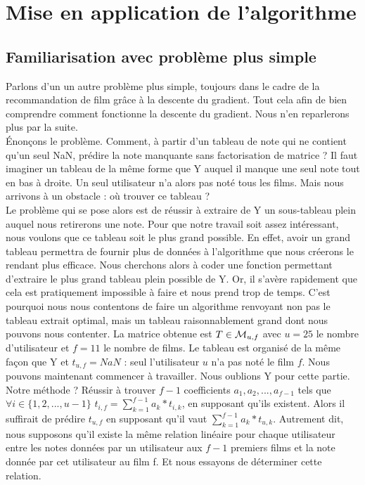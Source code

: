 \documentclass[a4paper,10pt]{article}
\begin{document}
\section{Mise en application de l'algorithme}
\subsection{Familiarisation avec problème plus simple}

Parlons d'un un autre problème plus simple, toujours dans le cadre de la recommandation de film grâce à la descente du gradient. Tout cela afin de bien comprendre comment fonctionne la descente du gradient. Nous n'en reparlerons plus par la suite.\\

Énonçons le problème. Comment, à partir d'un tableau de note qui ne contient qu'un seul NaN, prédire la note manquante sans factorisation de matrice ? Il faut imaginer un tableau de la même forme que Y auquel il manque une seul note tout en bas à droite. Un seul utilisateur n'a alors pas noté tous les films. Mais nous arrivons à un obstacle : où trouver ce tableau ?\\

Le problème qui se pose alors est de réussir à extraire de Y un sous-tableau plein auquel nous retirerons une note. Pour que notre travail soit assez intéressant, nous voulons que ce tableau soit le plus grand possible. En effet, avoir un grand tableau permettra de fournir plus de données à l'algorithme que nous créerons le rendant plus efficace. Nous cherchons alors à coder une fonction permettant d'extraire le plus grand tableau plein possible de Y. Or, il s'avère rapidement que cela est pratiquement impossible à faire et nous prend trop de temps. C'est pourquoi nous nous contentons de faire un algorithme renvoyant non pas le tableau extrait optimal, mais un tableau raisonnablement grand dont nous pouvons nous contenter. La matrice obtenue est $T \in {\cal M}_{u, f}$ avec $u = 25$ le nombre d'utilisateur et $f = 11$ le nombre de films. Le tableau est organisé de la même façon que Y et $t_{u, f} = NaN$ : seul l'utilisateur $u$ n'a pas noté le film $f$. Nous pouvons maintenant commencer à travailler. Nous oublions Y pour cette partie.\\

Notre méthode ? Réussir à trouver $f-1$ coefficients $a_1, a_2, ..., a_{f-1}$ tels que $\forall i \in \{1, 2, ..., u-1\}$ $t_{i, f} = \sum_{k = 1}^{f-1} a_k * t_{i, k}$, en supposant qu'ils existent. Alors il suffirait de prédire $t_{u, f}$ en supposant qu'il vaut $\sum_{k = 1}^{f-1} a_k * t_{u, k}$. Autrement dit, nous supposons qu'il existe la même relation linéaire pour chaque utilisateur entre les notes données par un utilisateur aux $f- 1$ premiers films et la note donnée par cet utilisateur au film f. Et nous essayons de déterminer cette relation.\\
\end{document}
